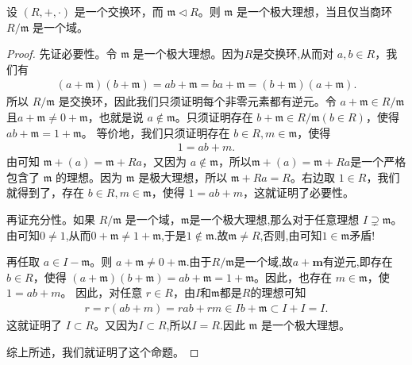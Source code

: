 \documentclass[../../main.tex]{subfiles}
\begin{document}
\begin{proposition}[极大理想的充要条件]\label{proposition:极大理想的充要条件}
设 $(R, +, \cdot)$ 是一个交换环，而 $\mathfrak{m} \lhd R$。则 $\mathfrak{m}$ 是一个极大理想，当且仅当商环 $R / \mathfrak{m}$ 是一个域。
\end{proposition}
\begin{proof}
先证必要性。令 $\mathfrak{m}$ 是一个极大理想。因为$R$是交换环,从而对 $a, b \in R$，我们有
\begin{align*}
(a + \mathfrak{m})(b + \mathfrak{m}) = ab + \mathfrak{m} = ba + \mathfrak{m} = (b + \mathfrak{m})(a + \mathfrak{m}).
\end{align*}
所以 $R / \mathfrak{m}$ 是交换环，因此我们只须证明每个非零元素都有逆元。令 $a + \mathfrak{m} \in R / \mathfrak{m}$且$a + \mathfrak{m} \neq 0 + \mathfrak{m}$，也就是说 $a \notin \mathfrak{m}$。只须证明存在 $b + \mathfrak{m} \in R / \mathfrak{m}(b \in R)$，使得 $ab + \mathfrak{m} = 1 + \mathfrak{m}$。
等价地，我们只须证明存在 $b \in R, m \in \mathfrak{m}$，使得
\begin{align*}
1 = ab + m .
\end{align*}
由可知 $\mathfrak{m}+(a)=\mathfrak{m} + Ra $，又因为 $a \notin \mathfrak{m}$，所以$\mathfrak{m}+(a)=\mathfrak{m} + Ra $是一个严格包含了 $\mathfrak{m}$ 的理想。因为 $\mathfrak{m}$ 是极大理想，所以 $\mathfrak{m} + Ra = R$。右边取 $1 \in R$，我们就得到了，存在 $b \in R,m\in \mathfrak{m}$，使得 $1 = ab + m$，这就证明了必要性。

再证充分性。如果 $R / \mathfrak{m}$ 是一个域，$\mathfrak{m}$是一个极大理想,那么对于任意理想 $I \supsetneq \mathfrak{m}$。由可知$0\ne 1$,从而$0+\mathfrak{m}\ne 1+\mathfrak{m}$,于是$1\notin \mathfrak{m}$.故$\mathfrak{m}\ne R$,否则,由可知$1\in \mathfrak{m}$矛盾!

再任取 $a \in I - \mathfrak{m}$。则 $a + \mathfrak{m} \neq 0 + \mathfrak{m}$.由于$R/\mathfrak{m}$是一个域,故$a+\mathbf{m}$有逆元,即存在 $b \in R$，使得 $(a+\mathfrak{m})(b+\mathfrak{m})=ab + \mathfrak{m} = 1 + \mathfrak{m}$。因此，也存在 $m \in \mathfrak{m}$，使 $1 = ab + m$。
因此，对任意 $r \in R$，由$I$和$\mathfrak{m}$都是$R$的理想可知
\begin{align*}
r = r(ab + m) = rab + rm \in Ib + \mathfrak{m} \subset I + I = I .
\end{align*}
这就证明了 $I\subset R$。又因为$I\subset R$,所以$I=R$.因此 $\mathfrak{m}$ 是一个极大理想。

综上所述，我们就证明了这个命题。 
\end{proof}
\end{document}
